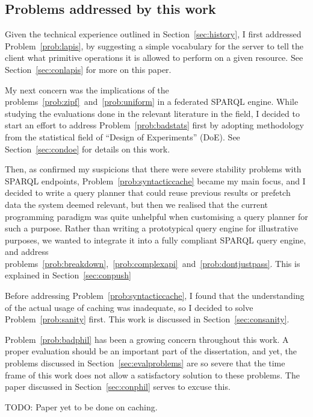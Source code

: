 \subsection{Problems addressed by this work}\label{sec:probaddress}

Given the technical experience outlined in Section~\ref{sec:history},
I first addressed Problem~\ref{prob:lapis}, by suggesting a simple
vocabulary for the server to tell the client what primitive operations
it is allowed to perform on a given resource. See
Section~\ref{sec:conlapis} for more on this paper.

My next concern was the implications of the
problems~\ref{prob:zipf}~and~\ref{prob:uniform} in a federated SPARQL
engine. While studying the evaluations done in the relevant literature
in the field, I decided to start an effort to address
Problem~\ref{prob:badstats} first by adopting methodology from the
statistical field of ``Design of Experiments'' (DoE). See
Section~\ref{sec:condoe} for details on this work.

Then, as \cite{buil2013sparql} confirmed my suspicions that there were
severe stability problems with SPARQL endpoints,
Problem~\ref{prob:syntacticcache} became my main focus, and I decided
to write a query planner that could reuse previous results or prefetch
data the system deemed relevant, but then we realised that the current
programming paradigm was quite unhelpful when customising a query
planner for such a purpose. Rather than writing a prototypical query
engine for illustrative purposes, we wanted to integrate it into a
fully compliant SPARQL query engine, and address
problems~\ref{prob:breakdown},~\ref{prob:complexapi}~and~\ref{prob:dontjustpass}. This
is explained in Section~\ref{sec:conpush}


Before addressing Problem~\ref{prob:syntacticcache}, I found that the
understanding of the actual usage of caching was inadequate, so I
decided to solve Problem~\ref{prob:sanity} first. This work is
discussed in Section~\ref{sec:consanity}.

Problem~\ref{prob:badphil} has been a growing concern throughout this
work. A proper evaluation should be an important part of the
dissertation, and yet, the problems discussed in
Section~\ref{sec:evalproblems} are so severe that the time frame of
this work does not allow a satisfactory solution to these
problems. The paper discussed in Section~\ref{sec:conphil} serves to
excuse this.

TODO: Paper yet to be done on caching.

